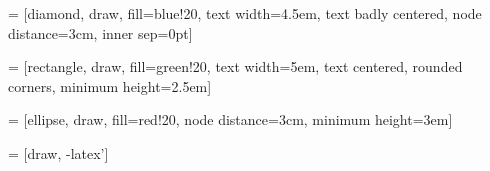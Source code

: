 \newcommand{\TEP}[1]{\AltRef{\emph{TEP#1}}{http://www.tinyos.net/tinyos-2.x/doc/pdf/tep#1.pdf}{links:tinyos:tep#1}}

\newcommand{\RFC}[1]{\AltRef{\emph{RFC#1}}{http://tools.ietf.org/pdf/rfc#1.pdf}{ietf:rfc#1}}



\newcommand{\MAN}[1]{\AltRef{\emph{\texttt{#1}}}{http://manpages.debian.net/cgi-bin/man.cgi?query=#1&sektion=0&format=ascii}{doc:linux:man:0:#1}}
\newcommand{\MANX}[2]{\AltRef{\emph{\texttt{#2}}}{http://manpages.debian.net/cgi-bin/man.cgi?query=#2&sektion=#1&format=ascii}{doc:linux:man:#1:#2}}


\newcommand{\Blob}[1]{\Href{https://github.com/errordeveloper/contiki-wmi/blob/wmi-work/#1}{\texttt{#1}}}
\newcommand{\Tree}[1]{\Href{https://github.com/errordeveloper/contiki-wmi/tree/wmi-work/#1}{\texttt{#1}}}
\newcommand{\Blame}[1]{\Href{https://github.com/errordeveloper/contiki-wmi/blame/wmi-work/#1}{\texttt{#1}}}
\newcommand{\Logs}[1]{\Href{https://github.com/errordeveloper/contiki-wmi/commits/wmi-work/#1}{\texttt{#1}}}
\newcommand{\Contrib}[1]{\Href{https://github.com/errordeveloper/contiki-wmi/commits/wmi-work/#1?author=errordeveloper}{\texttt{#1}}}

\usepackage{tikz}
\usetikzlibrary{automata,positioning,shapes,arrows}

 = [diamond,
			draw, fill=blue!20,
			text width=4.5em, text badly centered,
			node distance=3cm, inner sep=0pt]

 = [rectangle,
			draw, fill=green!20,
			text width=5em, text centered,
			rounded corners, minimum height=2.5em]

 = [ellipse,
			draw, fill=red!20,
			node distance=3cm, minimum height=3em]

 = [draw, -latex']

\usepackage{pstricks-add}

